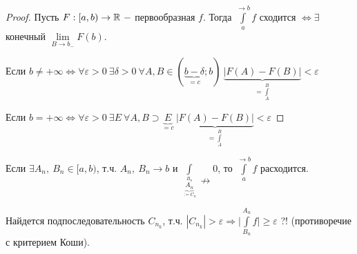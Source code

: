 \begin{proof}
    Пусть $F:[a,b)\rightarrow \mathbb{R}\ -$ первообразная $f$. Тогда $\int\limits_a^{\rightarrow b}f$ сходится $\Leftrightarrow \exists$ конечный $\lim\limits_{B\rightarrow b_-}F(b)$.

    Если $b\neq +\infty \Leftrightarrow \forall \varepsilon >0\ \exists \delta > 0\ \forall A,B\in (\underbrace{b-\delta}_{=c};b)\ \underbrace{|F(A)-F(B)|}_{=\int\limits_A^B}<\varepsilon$

    Если $b= +\infty \Leftrightarrow \forall \varepsilon >0\ \exists E\ \forall A,B \supset \underbrace{E}_{=c}\ \underbrace{|F(A)-F(B)|}_{=\int\limits_A^B}<\varepsilon$
\end{proof}

\begin{remark}
    Если $\exists A_n,\ B_n\in [a,b)$, т.ч. $A_n,\ B_n\rightarrow b$ и $\int\limits_{\underbrace{A_n}_{:=C_n}^{B_n}}\nrightarrow 0$, то $\int\limits_a^{\rightarrow b}f$ расходится.

    Найдется подпоследовательность $C_{n_k}$, т.ч. $|C_{n_k}|>\varepsilon\Rightarrow \bigg|\int\limits_{B_n}^{A_n}f\bigg|\geq \varepsilon$ ?! (противоречие с критерием Коши).
\end{remark}

